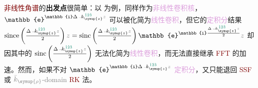 \textcolor{Maroon}{非线性角谱}的\textbf{出发点}很简单：以  为例，同样作为\textcolor{Plum}{非线性卷积核}，$\mathbb{e}^{\mathbb{i} \Delta \xint{\begin{smallmatrix} ~ \\ {}^{}_{\mathcolor{gray}{-}} \\ ~ \end{smallmatrix}}{15}{k}_{\symup{z}}^{\;\! \textcolor{PineGreen}{\hat{1} \hat{2} \hat{3}} } \mathcolor{gray}{z} }$ 可以被化简为\textcolor{Plum}{线性卷积}，但它的\textcolor{Plum}{定积分}结果 $\text{since} \left( \frac{ \Delta \xint{\begin{smallmatrix} ~ \\ {}^{}_{\mathcolor{gray}{-}} \\ ~ \end{smallmatrix}}{15}{k}_{\symup{z}}^{\;\! \textcolor{PineGreen}{\hat{1} \hat{2} \hat{3}} } \mathcolor{gray}{z} }{ 2 } \right) \mathcolor{gray}{z} = \text{sinc} \left( \frac{ \Delta \xint{\begin{smallmatrix} ~ \\ {}^{}_{\mathcolor{gray}{-}} \\ ~ \end{smallmatrix}}{15}{k}_{\symup{z}}^{\;\! \textcolor{PineGreen}{\hat{1} \hat{2} \hat{3}} } \mathcolor{gray}{z} }{ 2 } \right) \mathbb{e}^{\mathbb{i} \frac{ \Delta \xint{\begin{smallmatrix} ~ \\ {}^{}_{\mathcolor{gray}{-}} \\ ~ \end{smallmatrix}}{15}{k}_{\symup{z}}^{\;\! \textcolor{PineGreen}{\hat{1} \hat{2} \hat{3}} } \mathcolor{gray}{z} }{ 2 } } \mathcolor{gray}{z}$ 却因其中的 $\text{sinc} \left( \frac{ \Delta \xint{\begin{smallmatrix} ~ \\ {}^{}_{\mathcolor{gray}{-}} \\ ~ \end{smallmatrix}}{15}{k}_{\symup{z}}^{\;\! \textcolor{PineGreen}{\hat{1} \hat{2} \hat{3}} } \mathcolor{gray}{z} }{ 2 } \right)$ 无法化简为\textcolor{Plum}{线性卷积}，而无法直接继承 \textcolor{Maroon}{FFT} 的加速。然而，如果不对 $\mathbb{e}^{\mathbb{i} \Delta \xint{\begin{smallmatrix} ~ \\ {}^{}_{\mathcolor{gray}{-}} \\ ~ \end{smallmatrix}}{15}{k}_{\symup{z}}^{\;\! \textcolor{PineGreen}{\hat{1} \hat{2} \hat{3}} } \mathcolor{gray}{z} }$ \textcolor{Plum}{定积分}，又只能退回 \textcolor{Maroon}{SSF} 或 $\mathcolor{gray}{\bar{k}_{\symup{\rho}}}$\textcolor{gray}{-domain} \textcolor{Maroon}{RK} 法。


